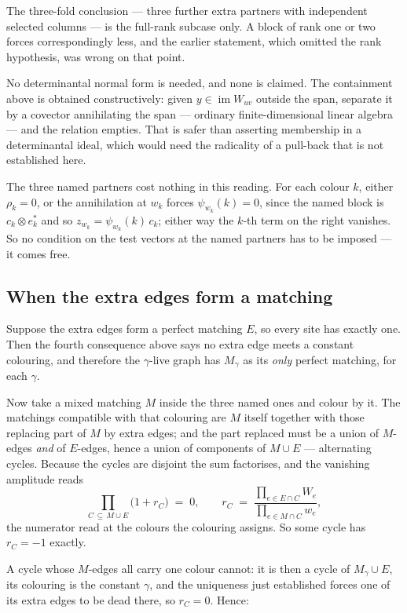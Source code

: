 \documentclass[11pt]{article}
\theoremstyle{definition}
\theoremstyle{remark}
\begin{document}
The three-fold conclusion --- three further extra partners with independent selected
columns --- is the full-rank subcase only. A block of rank one or two forces
correspondingly less, and the earlier statement, which omitted the rank hypothesis, was
wrong on that point.

No determinantal normal form is needed, and none is claimed. The containment above is
obtained constructively: given $y \in \operatorname{im} W_{uv}$ outside the span, separate
it by a covector annihilating the span --- ordinary finite-dimensional linear algebra ---
and the relation empties. That is safer than asserting membership in a determinantal
ideal, which would need the radicality of a pull-back that is not established here.

The three named partners cost nothing in this reading. For each colour $k$, either
$\rho_k = 0$, or the annihilation at $w_k$ forces $\psi_{w_k}(k) = 0$, since the named
block is $c_k \otimes e_k^{*}$ and so $z_{w_k} = \psi_{w_k}(k)\,c_k$; either way the $k$-th
term on the right vanishes. So no condition on the test vectors at the named partners has
to be imposed --- it comes free.

\subsection*{When the extra edges form a matching}

Suppose the extra edges form a perfect matching $E$, so every site has exactly one. Then
the fourth consequence above says no extra edge meets a constant colouring, and therefore
the $\gamma$-live graph has $M_\gamma$ as its \emph{only} perfect matching, for each
$\gamma$.

Now take a mixed matching $M$ inside the three named ones and colour by it. The matchings
compatible with that colouring are $M$ itself together with those replacing part of $M$ by
extra edges; and the part replaced must be a union of $M$-edges \emph{and} of $E$-edges,
hence a union of components of $M \cup E$ --- alternating cycles. Because the cycles are
disjoint the sum factorises, and the vanishing amplitude reads
\[
  \prod_{C \,\subseteq\, M \cup E} \bigl(1 + r_C\bigr) \;=\; 0,
  \qquad
  r_C \;=\; \frac{\prod_{e \in E \cap C} W_e}{\prod_{e \in M \cap C} w_e},
\]
the numerator read at the colours the colouring assigns. So some cycle has $r_C = -1$
exactly.

A cycle whose $M$-edges all carry one colour cannot: it is then a cycle of
$M_\gamma \cup E$, its colouring is the constant $\gamma$, and the uniqueness just
established forces one of its extra edges to be dead there, so $r_C = 0$. Hence:
\end{document}
